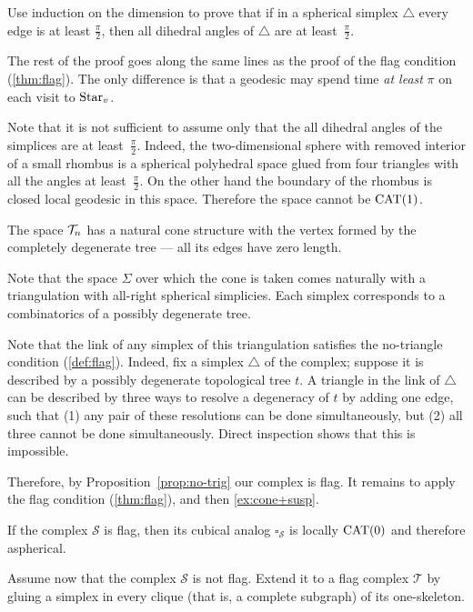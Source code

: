 Use induction on the dimension  to prove that if in a spherical simplex $\triangle$ every edge is at least $\tfrac\pi2$, then 
all dihedral angles of $\triangle$ are at least~$\tfrac\pi2$.

The rest of the proof goes along the same lines as the proof of the flag condition (\ref{thm:flag}).
The only difference is that a geodesic may spend time {}\emph{at least} $\pi$ on each visit to $\mathop{\rm Star}\nolimits_v$.

Note that it is not sufficient to assume only that the all dihedral angles of the simplices are at least~$\tfrac\pi2$. 
Indeed, the two-dimensional sphere with removed interior of a small rhombus is a spherical polyhedral space glued from four triangles with all the angles at least~$\tfrac\pi2$.
On the other hand the boundary of the rhombus is closed local geodesic in this space.
Therefore the space cannot be $\mathrm{CAT}(1)$.

The space $\mathcal{T}_n$ has a natural cone structure with the vertex formed by the  completely degenerate tree --- all its edges have zero length.

Note that the space $\Sigma$
over which the cone is taken comes naturally with a triangulation 
with all-right spherical simplicies.
Each simplex corresponds to a combinatorics of a possibly degenerate tree.

Note that the link of any simplex of this triangulation satisfies the no-triangle condition (\ref{def:flag}).
Indeed, fix a simplex $\triangle$ of the complex;
suppose it is described by a possibly degenerate topological tree $t$.
A triangle in the link of  $\triangle$ can be described by three ways to resolve a degeneracy of $t$ by adding one edge,
such that (1) any pair of these resolutions can be done simultaneously, but (2) all three cannot be done simultaneously.
Direct inspection shows that this is impossible.

Therefore, by Proposition~\ref{prop:no-trig} our complex is flag.
It remains to apply the flag condition (\ref{thm:flag}), and then \ref{ex:cone+susp}.

If the complex $\mathcal{S}$ is flag, then its cubical analog $\square_{\mathcal{S}}$ is locally $\mathrm{CAT}(0)$ and therefore aspherical.

Assume now that the complex $\mathcal{S}$ is not flag. 
Extend it to a flag complex $\mathcal{T}$ by gluing a simplex in every clique (that is, a complete subgraph) of its one-skeleton.

